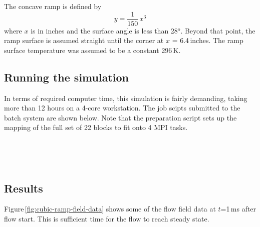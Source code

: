 \medskip
The concave ramp is defined by
$$
y = \frac{1}{150} \, x^3
$$
where $x$ is in inches and the surface angle is less than 28$^o$.
Beyond that point, the ramp surface is assumed straight until the corner
at $x$ = 6.4\,inches.
The ramp surface temperature was assumed to be a constant 296\,K.

\noindent
\topbar

\bottombar


\bigskip
\subsection{Running the simulation}
%
In terms of required computer time, this simulation is fairly demanding,
taking more than 12 hours on a 4-core workstation.
The job scipts submitted to the batch system are shown below.
Note that the preparation script sets up the mapping of the full set of 22 blocks to fit onto 4 MPI tasks.

\noindent
\topbar
{}
\bottombar\\
\topbar

\bottombar\\

\subsection{Results}
%
Figure\,\ref{fig:cubic-ramp-field-data} shows some of the flow field data 
at $t$=1\,ms after flow start.
This is sufficient time for the flow to reach steady state.

